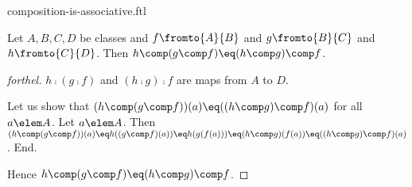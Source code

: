 \documentclass{naproche-library}
\begin{document}
\begin{smodule}[title=Composition is Associative]{composition-is-associative.ftl}


\begin{proposition}[forthel,id=CompIsAssociativeProp]
  Let $A, B, C, D$ be classes and $f \fromto{A}{B}$ and $g \fromto{B}{C}$ and $h \fromto{C}{D}$.
  Then $h \comp (g \comp f) \eq (h \comp g) \comp f$.
\end{proposition}
\begin{proof}[forthel]
  $h \comp (g \comp f)$ and $(h \comp g) \comp f$ are maps from $A$ to $D$.

  Let us show that $(h \comp (g \comp f))(a) \eq ((h \comp g) \comp f)(a)$ for all $a \elem A$.
    Let $a \elem A$.
    Then $(h \comp (g \comp f))(a)
      \eq h((g \comp f)(a))
      \eq h(g(f(a)))
      \eq (h \comp g)(f(a))
      \eq ((h \comp g) \comp f)(a)$.
  End.

  Hence $h \comp (g \comp f) \eq (h \comp g) \comp f$.
\end{proof}

\end{smodule}
\end{document}
